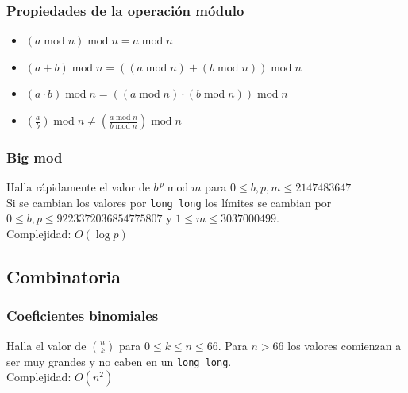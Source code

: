 \documentclass[10pt,letterpaper,twocolumn]{article}
\newcommand{\source}[1]{
  
  \dotfill
}
\begin{document}
    \subsubsection{Propiedades de la operación módulo}
    \begin{itemize}
      \item $(a \operatorname{mod} n) \operatorname{mod} n = a \operatorname{mod} n$
      \item $(a + b) \operatorname{mod} n = ((a \operatorname{mod} n) + (b\operatorname{mod} n)) \operatorname{mod} n$
      \item $(a \cdot b) \operatorname{mod} n = ((a \operatorname{mod} n) \cdot (b\operatorname{mod} n)) \operatorname{mod} n$
      \item $\displaystyle\left(\frac{a}{b} \right) \operatorname{mod} n \neq \left(\frac{a \operatorname{mod} n}{b\operatorname{mod} n}\right) \operatorname{mod} n$
    \end{itemize}

    \subsubsection{Big mod}
    Halla rápidamente el valor de $b^{\,p} \operatorname{mod} m$ para $0 \leq b,p,m \leq 2147483647$\\
    Si se cambian los valores por \verb|long long| los límites se cambian por $0 \leq b,p \leq 9223372036854775807$ y $1 \leq m \leq 3037000499$.\\
    Complejidad: $O(\operatorname{log} p)$\\
    \source{./src/bigmod.cpp}

  \subsection{Combinatoria}
    \subsubsection{Coeficientes binomiales}
    Halla el valor de $\binom{n}{k}$ para $0 \leq k \leq n \leq 66$. Para $n > 66$ los valores comienzan a ser muy grandes y no caben en un \verb|long long|.\\
    Complejidad: $O(n^2)$\\
    \source{./src/binomial.cpp}
\end{document}

